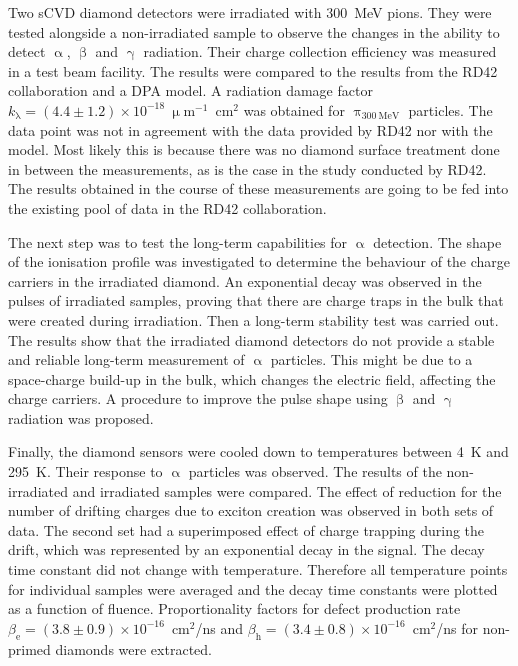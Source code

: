 Two sCVD diamond detectors were irradiated with 300~MeV pions. They were tested alongside a non-irradiated sample to observe the changes in the ability to detect $\upalpha$, $\upbeta$ and $\upgamma$ radiation. Their charge collection efficiency was measured in a test beam facility. The results were compared to the results from the RD42 collaboration and a DPA model. A radiation damage factor $k_{\mathrm{\lambda}}=(4.4\pm1.2)\times10^{-18}~\upmu$m$^{-1}$~cm$^{2}$ was obtained for $\uppi_{\mathrm{300~MeV}}$ particles. The data point was not in agreement with the data provided by RD42 nor with the model. %
Most likely this is because there was no diamond surface treatment done in between the measurements, as is the case in the study conducted by RD42. The results obtained in the course of these measurements are going to be fed into the existing pool of data in the RD42 collaboration.

The next step was to test the long-term capabilities for $\upalpha$ detection. The shape of the ionisation profile was investigated to determine the behaviour of the charge carriers in the irradiated diamond. An exponential decay was observed in the pulses of irradiated samples, proving that there are charge traps in the bulk that were created during irradiation. Then a long-term stability test was carried out. The results show that the irradiated diamond detectors do not provide a stable and reliable long-term measurement of $\upalpha$ particles. This might be due to a space-charge build-up in the bulk, which changes the electric field, affecting the charge carriers. A procedure to improve the pulse shape using $\upbeta$ and $\upgamma$ radiation was proposed.

Finally, the diamond sensors were cooled down to temperatures between 4~K and 295~K. Their response to $\upalpha$ particles was observed. The results of the non-irradiated and irradiated samples were compared. The effect of reduction for the number of drifting charges due to exciton creation was observed in both sets of data. The second set had a superimposed effect of charge trapping during the drift, which was represented by an exponential decay in the signal. The decay time constant did not change with temperature. Therefore all temperature points for individual samples were averaged and the decay time constants were plotted as a function of fluence. Proportionality factors for defect production rate $\beta_\mathrm{e}=(3.8\pm0.9)\times10^{-16}$~cm$^2$/ns and $\beta_\mathrm{h}=(3.4\pm0.8)\times10^{-16}$~cm$^2$/ns for non-primed diamonds were extracted.
